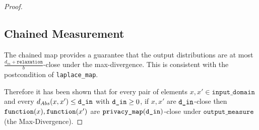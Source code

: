 \documentclass{article}
\begin{document}
\begin{proof}
\subsection{Chained Measurement}
The chained map provides a guarantee that the output distributions are at most $\frac{d_{in} + \texttt{relaxation}}{b}$-close under the max-divergence.
This is consistent with the postcondition of \texttt{laplace\_map}.

Therefore it has been shown that for every pair of elements $x, x' \in \texttt{input\_domain}$ and every $d_{Abs}(x, x') \le \texttt{d\_in}$ with $\texttt{d\_in} \ge 0$, 
if $x, x'$ are $\texttt{d\_in}$-close then $\texttt{function}(x), \texttt{function}(x')$ are $\texttt{privacy\_map}(\texttt{d\_in})$-close under $\texttt{output\_measure}$ (the Max-Divergence).

\end{proof}
\end{document}
